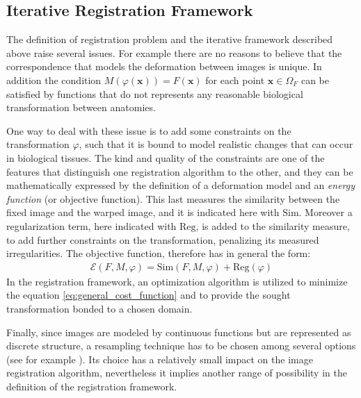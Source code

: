 \subsection{Iterative Registration Framework}

The definition of registration problem and the iterative framework described above raise several issues. For example there are no reasons to believe that the correspondence that models the deformation between images is unique. In addition the condition $M(\varphi (\mathbf{x})) = F(\mathbf{x})$ for each point $\mathbf{x}\in \Omega_{F} $ can be satisfied by functions that do not represents any reasonable biological transformation between anatomies.

One way to deal with these issue is to add some constraints on the transformation $\varphi$, such that it is bound to model realistic changes that can occur in biological tissues. The kind and quality of the constraints are one of the features that distinguish one registration algorithm to the other, and they can be mathematically expressed by the definition of a deformation model and an \emph{energy function} (or objective function). This last measures the similarity between the fixed image and the warped image, and it is indicated here with $\text{Sim}$. Moreover a regularization term, here indicated with $\text{Reg}$, is added to the similarity measure, to 
add further constraints on the transformation, penalizing its measured irregularities. The objective function, therefore has in general the form:
\begin{align}\label{eq:general_cost_function}
\mathcal{E}(F, M, \varphi) = \text{Sim}(F,M,\varphi) + \text{Reg}(\varphi) 
\end{align}
In the registration framework, an optimization algorithm is utilized to minimize the equation \ref{eq:general_cost_function} and to provide the sought transformation bonded to a chosen domain.

Finally, since images are modeled by continuous functions but are represented as discrete structure, a resampling technique has to be chosen among several options (see for example \cite{gonzalezdigital}). 
Its choice has a relatively small impact on the image registration algorithm, nevertheless it implies another range of possibility in the definition of the registration framework.

